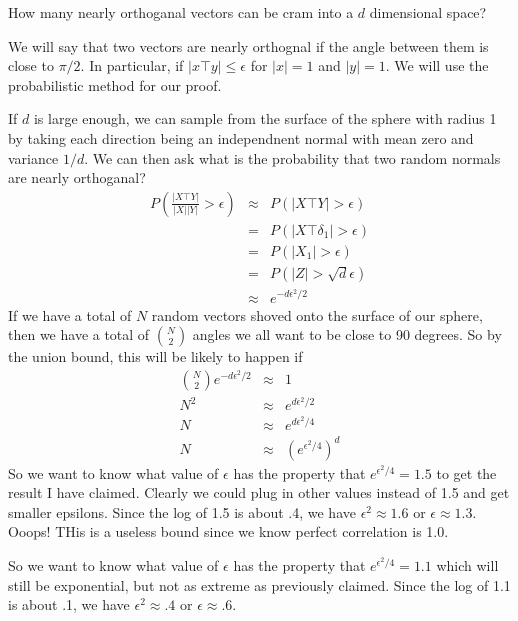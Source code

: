 \documentclass{article}
\begin{document}
How many nearly orthoganal vectors can be cram into a $d$ dimensional
space? 

We will say that two vectors are nearly orthognal if the angle between
them is close to $\pi/2$.  In particular, if $|x\top y| \le \epsilon$
for $|x| = 1$ and $|y| = 1$.  We will use the probabilistic method for
our proof.

If $d$ is large enough, we can sample from the surface of the sphere
with radius 1 by taking each direction being an independnent normal
with mean zero and variance $1/d$.  We can then ask what is the
probability that two random normals are nearly orthoganal?
\begin{eqnarray*}
P(\frac{|X\top Y|}{|X||Y|} > \epsilon) & \approx & P(|X\top Y|>\epsilon)\\
& = & P(|X\top \delta_1| > \epsilon)\\
& = & P(|X_1| > \epsilon)\\
& = & P(|Z| > \sqrt{d}\epsilon)\\
& \approx & e^{-d\epsilon^2/2}
\end{eqnarray*}
If we have a total of $N$ random vectors shoved onto the surface of
our sphere, then we have a total of $N \choose 2$ angles we all want
to be close to 90 degrees.  So by the union bound, this will be likely
to happen if 
\begin{eqnarray*}
{N \choose 2} e^{-d\epsilon^2/2} & \approx & 1 \\
N^2& \approx &  e^{d\epsilon^2/2} \\
N& \approx &  e^{d\epsilon^2/4} \\
N& \approx &  (e^{\epsilon^2/4})^d
\end{eqnarray*}
So we want to know what value of $\epsilon$ has the property that
$e^{\epsilon^2/4} = 1.5$ to get the result I have claimed.  Clearly we
could plug in other values instead of 1.5 and get smaller epsilons.
Since the log of 1.5 is about .4, we have $\epsilon^2 \approx 1.6$ or
$\epsilon \approx 1.3$.  Ooops!  THis is a useless bound since we know
perfect correlation is 1.0. 

So we want to know what value of $\epsilon$ has the property that
 $e^{\epsilon^2/4} = 1.1$ which will still be exponential, but not as
 extreme as previously claimed.  Since the log of 1.1 is about .1, we
 have $\epsilon^2 \approx .4$ or $\epsilon \approx .6$.
\end{document}
